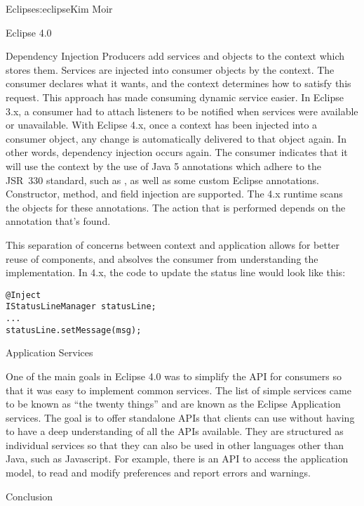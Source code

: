 \begin{aosachapter}{Eclipse}{s:eclipse}{Kim Moir}
\begin{aosasect1}{Eclipse 4.0}
\begin{aosasect2}{Dependency Injection}
Producers add services and objects to the context which stores them.
Services are injected into consumer objects by the context. The
consumer declares what it wants, and the context determines how to
satisfy this request. This approach has made consuming dynamic service
easier. In Eclipse 3.x, a consumer had to attach listeners to be
notified when services were available or unavailable. With Eclipse
4.x, once a context has been injected into a consumer object, any
change is automatically delivered to that object again. In other
words, dependency injection occurs again. The consumer indicates that
it will use the context by the use of Java 5 annotations which adhere
to the JSR~330 standard, such as , as well as some
custom Eclipse annotations. Constructor, method, and field injection
are supported.  The 4.x runtime scans the objects for these
annotations. The action that is performed depends on the annotation
that's found.

This separation of concerns between context and application allows for
better reuse of components, and absolves the consumer from
understanding the implementation.  In 4.x, the code to update the
status line would look like this:

\begin{verbatim}
@Inject
IStatusLineManager statusLine;
...
statusLine.setMessage(msg);
\end{verbatim}

\end{aosasect2}

\begin{aosasect2}{Application Services}

One of the main goals in Eclipse 4.0 was to simplify the API for
consumers so that it was easy to implement common services. The list
of simple services came to be known as ``the twenty things'' and are
known as the Eclipse Application services. The goal is to offer
standalone APIs that clients can use without having to have a deep
understanding of all the APIs available. They are structured as
individual services so that they can also be used in other languages
other than Java, such as Javascript.  For example, there is an API to
access the application model, to read and modify preferences and
report errors and warnings.

\end{aosasect2}

\end{aosasect1}

\begin{aosasect1}{Conclusion}


\end{aosasect1}
\end{aosachapter}
